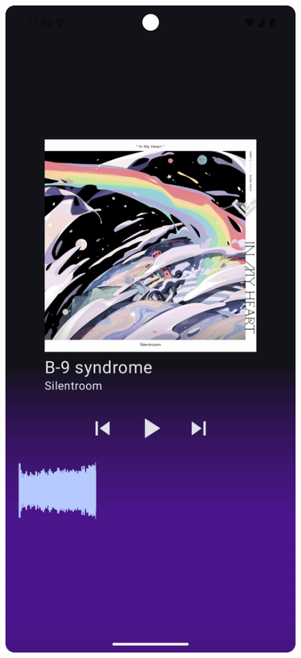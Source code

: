 \begin{figure}[H]
	\caption{}
	\label{fig:test_player_playing}
\end{figure}

\begin{figure}[H]
	\centering
	\includegraphics[width=1\textwidth]{images/test_player_paused.png}
	\caption{}
	\label{fig:test_player_paused}
\end{figure}

